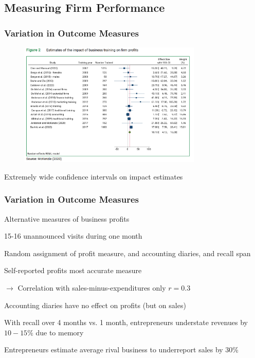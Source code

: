 \documentclass[hideothersubsections, usenames,dvipsnames,11pt]{beamer}
\newenvironment{itemize_2pt}{\itemize\addtolength{\itemsep}{2pt}}{\enditemize}
\newenvironment{enumerate_2pt}{\enumerate\addtolength{\itemsep}{2pt}}{\endenumerate}
\begin{document}
\subsection{Measuring Firm Performance}

\begin{frame}
\frametitle{Variation in Outcome Measures}
	
	\begin{figure}[htbp]
		\centering
		\includegraphics[width=23.5em]{pics/McK2020_profits.png}
		\label{McKenzie(2020): Profits2}
	\end{figure}	
	
\vspace{-1em}	
	
	\begin{itemize_2pt}
		\item \textcolor{bdf}{Extremely wide confidence intervals} on impact estimates
	\end{itemize_2pt}
\end{frame}


\begin{frame}
\frametitle{Variation in Outcome Measures}

Alternative measures of business profits \citep{deMel2009}
	\begin{itemize_2pt}
		\item 15-16 unannounced visits during one month
		\item Random assignment of profit measure, and accounting diaries, and recall span
	\end{itemize_2pt}
		
	\pause	
		
	\vspace{0.5em}
		
	\begin{enumerate_2pt}
		\item \textcolor{bdf}{Self-reported profits most accurate measure}
		\item[] $\rightarrow$ Correlation with sales-minus-expenditures only $r=0.3$
		\item \textcolor{bdf}{Accounting diaries have no effect on profits} (but on sales)
		\item With recall over 4 months vs. 1 month, entrepreneurs \textcolor{bdf}{understate revenues by $10 - 15 \%$ due to memory} 
		\item Entrepreneurs estimate average rival business to \textcolor{bdf}{underreport sales by 30\%}
	\end{enumerate_2pt}	

\end{frame}
\end{document}
